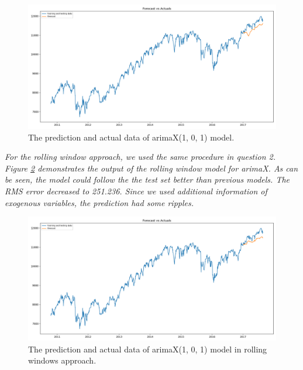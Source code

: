 \begin{figure}[H]
    \centering
    \begin{minipage}[b]{1\textwidth}
        \includegraphics[width=\textwidth]{manuscript/src/figures/Ass2/Ass2_Q3_Forecast_vs_Actuals.png}
    \end{minipage}
    \caption{The prediction and actual data of \gls{arima}X(1, 0, 1) model.}
    \label{fig:Ass2_Q3_Forecast_vs_Actuals}
\end{figure}





\textit{For the rolling window approach, we used the same procedure in question 2. Figure \ref{fig:Ass2_Q3_Rolling_Forecast_vs_Actuals} demonstrates the output of the rolling window model for \gls{arima}X. As can be seen, the model could follow the the test set better than previous models. The RMS error decreased to 251.236. Since we used additional information of exogenous variables, the prediction had some ripples.}

\begin{figure}[H]
    \centering
    \begin{minipage}[b]{1\textwidth}
        \includegraphics[width=\textwidth]{manuscript/src/figures/Ass2/Ass2_Q3_Rolling_Forecast_vs_Actuals.png}
    \end{minipage}
    \caption{The prediction and actual data of \gls{arima}X(1, 0, 1) model in rolling windows approach.}
    \label{fig:Ass2_Q3_Rolling_Forecast_vs_Actuals}
\end{figure}








